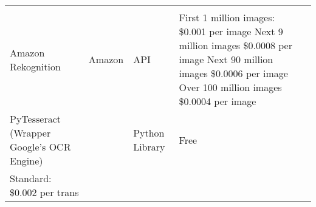 \documentclass[
]{article}
\begin{document}
\begin{longtable}[]{@{}lllll@{}}
\begin{minipage}[t]{0.18\columnwidth}
\strut
\end{minipage}\tabularnewline
\begin{minipage}[t]{0.37\columnwidth}\raggedright
Amazon Rekognition\strut
\end{minipage} & \begin{minipage}[t]{0.09\columnwidth}\raggedright
Amazon\strut
\end{minipage} & \begin{minipage}[t]{0.14\columnwidth}\raggedright
API\strut
\end{minipage} & \begin{minipage}[t]{0.07\columnwidth}\raggedright
First 1 million images: \$0.001 per image Next 9 million images \$0.0008
per image Next 90 million images \$0.0006 per image Over 100 million
images \$0.0004 per image\strut
\end{minipage} & \begin{minipage}[t]{0.18\columnwidth}\raggedright
\strut
\end{minipage}\tabularnewline
\begin{minipage}[t]{0.37\columnwidth}\raggedright
PyTesseract (Wrapper Google's OCR Engine)\strut
\end{minipage} & \begin{minipage}[t]{0.09\columnwidth}\raggedright
\strut
\end{minipage} & \begin{minipage}[t]{0.14\columnwidth}\raggedright
Python Library\strut
\end{minipage} & \begin{minipage}[t]{0.07\columnwidth}\raggedright
Free\strut
\end{minipage} & \begin{minipage}[t]{0.18\columnwidth}\raggedright
\strut
\end{minipage}\tabularnewline
\begin{minipage}[t]{0.37\columnwidth}\raggedright
Standard: \$0.002 per trans\strut
\end{minipage} & \begin{minipage}[t]{0.09\columnwidth}\raggedright
\strut
\end{minipage} & \begin{minipage}[t]{0.14\columnwidth}\raggedright
\strut
\end{minipage} & \begin{minipage}[t]{0.07\columnwidth}\raggedright
\strut
\end{minipage} & \begin{minipage}[t]{0.18\columnwidth}\raggedright

\end{minipage}
\end{longtable}
\end{document}
